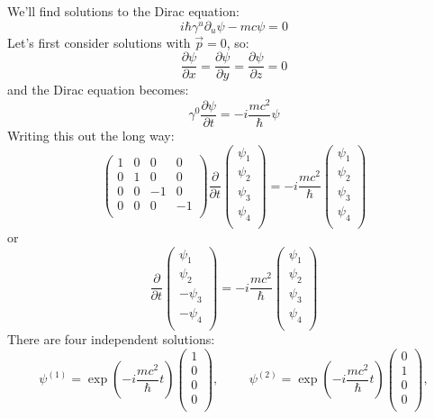 \documentclass[12pt]{book}
\begin{document}
We'll find solutions to the Dirac equation:
$$i\hbar \gamma^u \partial_u \psi -mc \psi = 0$$
Let's first consider solutions with $\vec{p}=0$, so:
$$\frac{\partial\psi}{\partial x} = \frac{\partial\psi}{\partial y} = \frac{\partial\psi}{\partial z} = 0$$
and the Dirac equation becomes:
$$\gamma^0 \frac{\partial \psi}{\partial t} = -i \frac{mc^2}{\hbar} \psi $$
Writing this out the long way:
$$
\begin{pmatrix} 
1 & 0 & 0 & 0\\
0 & 1 & 0 & 0\\
0 & 0 &-1 & 0\\
0 & 0 & 0 &-1\\
\end{pmatrix}
\frac{\partial}{\partial t}
\begin{pmatrix} 
\psi_1\\
\psi_2\\
\psi_3\\
\psi_4\\
\end{pmatrix}
=
-i \frac{mc^2}{\hbar}
\begin{pmatrix} 
\psi_1\\
\psi_2\\
\psi_3\\
\psi_4\\
\end{pmatrix}
$$
or
$$
\frac{\partial}{\partial t}
\begin{pmatrix} 
\psi_1\\
\psi_2\\
-\psi_3\\
-\psi_4\\
\end{pmatrix}
=
-i \frac{mc^2}{\hbar}
\begin{pmatrix} 
\psi_1\\
\psi_2\\
\psi_3\\
\psi_4\\
\end{pmatrix}
$$
There are four independent solutions:
$$
\psi^{(1)} = \exp\left(- i \frac{mc^2}{\hbar} t\right)
\begin{pmatrix} 
1\\
0\\
0\\
0\\
\end{pmatrix},
\hspace{1cm}
\psi^{(2)} = \exp\left(- i \frac{mc^2}{\hbar} t\right)
\begin{pmatrix} 
0\\
1\\
0\\
0\\
\end{pmatrix},
$$
\end{document}
